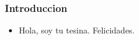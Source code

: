 \begin{frame}
  \frametitle{Introduccion}
      \begin{itemize}
      \item Hola, soy tu tesina. Felicidades.
      \end{itemize}
\end{frame}
